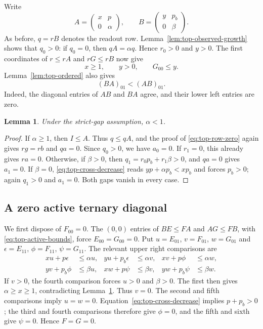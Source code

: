 \documentclass[11pt,a4paper]{article}
\newtheorem{lemma}[theorem]{Lemma}
\begin{document}
Write
\begin{equation}\label{eq:top-upper-shapes}
A=\begin{pmatrix}x&p\\0&\alpha\end{pmatrix},\qquad
B=\begin{pmatrix}y&p_b\\0&\beta\end{pmatrix}.
\end{equation}
As before, $q=rB$ denotes the readout row.
Lemma~\ref{lem:top-observed-growth} shows that $q_0>0$: if $q_0=0$,
then $qA=\alpha q$. Hence $r_0>0$ and $y>0$.
The first coordinates of $r\le rA$ and $rG\le rB$ now give
\begin{equation}\label{eq:top-active-bounds}
x\ge1,\qquad y>0,\qquad G_{00}\le y.
\end{equation}
Lemma~\ref{lem:top-ordered} also gives
\begin{equation}\label{eq:top-cross-decrease}
(BA)_{01}<(AB)_{01}.
\end{equation}
Indeed, the diagonal entries of $AB$ and $BA$ agree, and their lower
left entries are zero.

\begin{lemma}\label{lem:top-contracting-secondary}
Under the strict-gap assumption, $\alpha<1$.
\end{lemma}
\begin{proof}
If $\alpha\ge1$, then $I\le A$. Thus $q\le qA$, and the proof of
\eqref{eq:top-row-zero} again gives $rg=rb$ and $qa=0$.
Since $q_0>0$, we have $a_0=0$.
If $r_1=0$, this already gives $ra=0$. Otherwise, if $\beta>0$,
then $q_1=r_0p_b+r_1\beta>0$, and $qa=0$ gives $a_1=0$.
If $\beta=0$, \eqref{eq:top-cross-decrease} reads
$yp+\alpha p_b<xp_b$ and forces $p_b>0$; again
$q_1>0$ and $a_1=0$. Both gaps vanish in every case.
\end{proof}

\subsection{A zero active ternary diagonal}

We first dispose of $F_{00}=0$. The $(0,0)$ entries of
$BE\le FA$ and $AG\le FB$, with \eqref{eq:top-active-bounds},
force $E_{00}=G_{00}=0$. Put $u=E_{01}$, $v=F_{01}$,
$w=G_{01}$ and $\epsilon=E_{11}$, $\phi=F_{11}$,
$\psi=G_{11}$. The relevant upper right comparisons are
\begin{align*}
xu+p\epsilon&\le\alpha u,&
yu+p_b\epsilon&\le\alpha v,&
xv+p\phi&\le\alpha w,\\
yv+p_b\phi&\le\beta u,&
xw+p\psi&\le\beta v,&
yw+p_b\psi&\le\beta w.
\end{align*}
If $v>0$, the fourth comparison forces $u>0$ and $\beta>0$.
The first then gives $\alpha\ge x\ge1$, contradicting
Lemma~\ref{lem:top-contracting-secondary}. Thus $v=0$.
The second and fifth comparisons imply $u=w=0$.
Equation~\eqref{eq:top-cross-decrease} implies $p+p_b>0$;
the third and fourth comparisons therefore give $\phi=0$,
and the fifth and sixth give $\psi=0$. Hence $F=G=0$.
\end{document}
